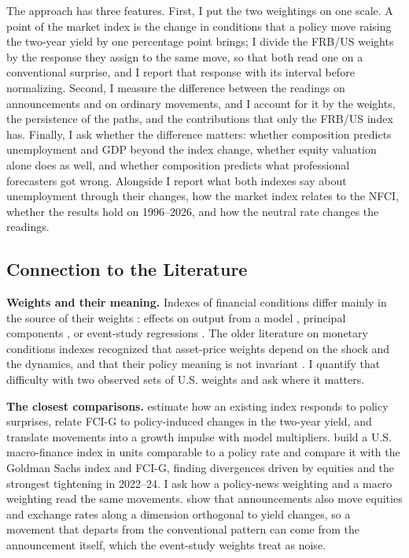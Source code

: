 \documentclass[11pt]{article}
\begin{document}
The approach has three features. First, I put the two weightings on one scale. A point of the market index is the change in conditions that a policy move raising the two-year yield by one percentage point brings; I divide the FRB/US weights by the response they assign to the same move, so that both read one on a conventional surprise, and I report that response with its interval before normalizing. Second, I measure the difference between the readings on announcements and on ordinary movements, and I account for it by the weights, the persistence of the paths, and the contributions that only the FRB/US index has. Finally, I ask whether the difference matters: whether composition predicts unemployment and GDP beyond the index change, whether equity valuation alone does as well, and whether composition predicts what professional forecasters got wrong. Alongside I report what both indexes say about unemployment through their changes, how the market index relates to the NFCI, whether the results hold on 1996--2026, and how the neutral rate changes the readings.

\subsection{Connection to the Literature}
\textbf{Weights and their meaning.} Indexes of financial conditions differ mainly in the source of their weights \citep{hatzius2010}: effects on output from a model \citep{dudley2000,hatzius2018,ajello2023}, principal components \citep{brave2011}, or event-study regressions \citep{kuttner2001,gurkaynak2005,bernanke2005,nakamura2018,bauer2023}. The older literature on monetary conditions indexes recognized that asset-price weights depend on the shock and the dynamics, and that their policy meaning is not invariant \citep{eika1996,batini2002}. I quantify that difficulty with two observed sets of U.S. weights and ask where it matters.

\textbf{The closest comparisons.} \citet{arnaut2024} estimate how an existing index responds to policy surprises, \citet{sack2023} relate FCI-G to policy-induced changes in the two-year yield, and \citet{ajello2023} translate movements into a growth impulse with model multipliers. \citet{bletzinger2026} build a U.S. macro-finance index in units comparable to a policy rate and compare it with the Goldman Sachs index and FCI-G, finding divergences driven by equities and the strongest tightening in 2022--24. I ask how a policy-news weighting and a macro weighting read the same movements. \citet{boehm2025} show that announcements also move equities and exchange rates along a dimension orthogonal to yield changes, so a movement that departs from the conventional pattern can come from the announcement itself, which the event-study weights treat as noise.
\end{document}
